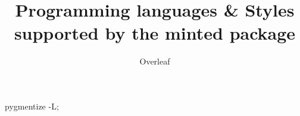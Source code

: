 \documentclass[12pt,a4paper,DIV=16]{scrartcl}
\title{Programming languages \& Styles supported by the minted package}
\author{Overleaf}
\date{}
\begin{document}
\maketitle

\bash[stdout]
pygmentize -L;
\END
\end{document}
